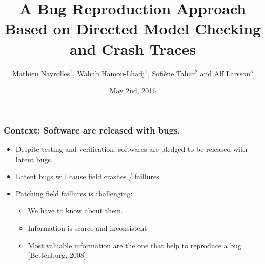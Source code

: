 \documentclass{beamer}
\title[JCHARMING]{A Bug Reproduction Approach Based on Directed Model Checking and Crash Traces} %
\author[Mathieu Nayrolles]{\underline{Mathieu Nayrolles$^1$}, Wahab Hamou-Lhadj$^1$, Sofi\`ene Tahar$^2$ and Alf Larsson$^3$} %
\institute[Concordia] %
{
$^1$Software Behaviour Analysis (SBA) Research Lab, ECE,  Concordia, Montr\'eal, Canada\\
$^2$Hardware Verification Group (HVG) Research Lab, ECE, Concordia, Montr\'eal, Canada \\
$^3$PLF System Management, R\&D Ericsson, Stockholm, Sweden \\
\medskip
\textit{mathieu.nayrolles@gmail.com, wahab.hamou-lhadj@concordia.ca, tahar@ece.concordia.ca, alf.larsson@ericsson.com} %
}
\date{May 2nd, 2016} %
\begin{document}
\begin{frame}
\titlepage %
\end{frame}


\begin{frame}
\frametitle{Context: Software are released with bugs.}

\begin{itemize}
\item Despite testing and verification, softwares are pledged to be released with latent bugs.
\vspace{0.3cm}
\item Latent bugs will cause field crashes / faillures.
\vspace{0.3cm}
\item Patching field faillures is challenging:
\begin{itemize}
\vspace{0.3cm}
\item We have to know about them.
\vspace{0.3cm}
\item Information is scarce and inconsistent
\vspace{0.3cm}
\item Most valuable information are the one that help to reproduce a bug [Bettenburg, 2008].
\end{itemize}
\end{itemize}
\end{frame}
\end{document}
